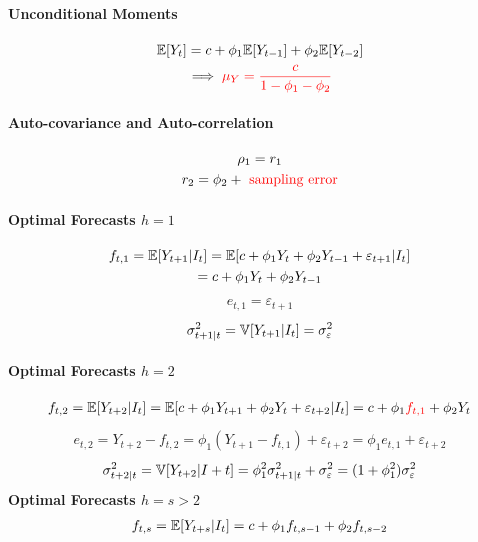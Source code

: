 \documentclass[11pt]{article}
\begin{document}
			\paragraph{Unconditional Moments}
				\begin{gather}
					\mathbb{E}[{Y_t}] = c + \phi_1 \mathbb{E}[{Y_{t-1}}] + \phi_2 \mathbb{E}[{Y_{t-2}}] \\
					\implies \textcolor{red}{\mu_Y = \frac{c}{1 - \phi_1 - \phi_2}}
				\end{gather}
			\paragraph{Auto-covariance and Auto-correlation}
				\begin{gather}
					\rho_1 = r_1 \\
					r_2 = \phi_2 + \textcolor{red}{\text{ sampling error}}
				\end{gather}
			\paragraph{Optimal Forecasts $h=1$}
				\begin{gather}
					f_{t,1} = \mathbb{E}[{Y_{t+1}|I_t}]
					= \mathbb{E}[{c + \phi_1 Y_t + \phi_2 Y_{t-1} + \varepsilon_{t+1}|I_t}] \\
					= c + \phi_1 Y_t + \phi_2 Y_{t-1}
				\end{gather}
				\begin{gather}
					e_{t,1} = \varepsilon_{t+1}
				\end{gather}
				\begin{gather}
					\sigma_{t+1|t}^2 = \mathbb{V}[{Y_{t+1}|I_t}] = \sigma_\varepsilon^2
				\end{gather}
			\paragraph{Optimal Forecasts $h=2$}
				\begin{gather}
					f_{t,2} = \mathbb{E}[{Y_{t+2}|I_t}]
					= \mathbb{E}[{c + \phi_1 Y_{t+1} + \phi_2 Y_t + \varepsilon_{t+2}|I_t}]
					= c + \phi_1 \textcolor{red}{f_{t,1}} + \phi_2 Y_t 
				\end{gather}
				\begin{gather}
					e_{t,2} = Y_{t+2} - f_{t,2}
					= \phi_1 (Y_{t+1} - f_{t,1}) + \varepsilon_{t+2}
					= \phi_1 e_{t,1} + \varepsilon_{t+2}
				\end{gather}
				\begin{gather}
					\sigma_{t+2|t}^2 = \mathbb{V}[{Y_{t+2}|I+t}]
					= \phi_1^2 \sigma_{t+1|t}^2 + \sigma_\varepsilon^2
					= (1 + \phi_1^2) \sigma_\varepsilon^2
				\end{gather}
			\textbf{Optimal Forecasts $h=s>2$}
				\begin{align}
					f_{t, s} = \mathbb{E}[{Y_{t+s}|I_t}]
					= c + \phi_1 f_{t, s-1} + \phi_2 f_{t, s-2}
				\end{align}
				
\end{document}
